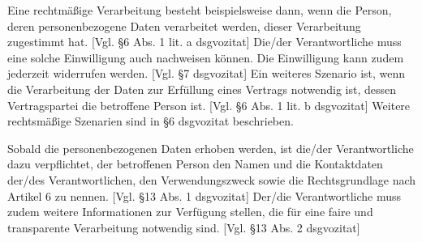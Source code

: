 Eine rechtmäßige Verarbeitung besteht beispielsweise dann, wenn die Person, deren personenbezogene Daten verarbeitet werden, dieser Verarbeitung zugestimmt hat. [Vgl. §6 Abs. 1 lit. a \gls{dsgvozitat}] Die/der Verantwortliche muss eine solche Einwilligung auch nachweisen können. Die Einwilligung kann zudem jederzeit widerrufen werden. [Vgl. §7 \gls{dsgvozitat}] Ein weiteres Szenario ist, wenn die Verarbeitung der Daten zur Erfüllung eines Vertrags notwendig ist, dessen Vertragspartei die betroffene Person ist. [Vgl. §6 Abs. 1 lit. b \gls{dsgvozitat}] Weitere rechtsmäßige Szenarien sind in §6 \gls{dsgvozitat} beschrieben.  

Sobald die personenbezogenen Daten erhoben werden, ist die/der Verantwortliche dazu verpflichtet, der betroffenen Person den Namen und die Kontaktdaten der/des Verantwortlichen, den Verwendungszweck sowie die Rechtsgrundlage nach Artikel 6 zu nennen. [Vgl. §13 Abs. 1 \gls{dsgvozitat}] Der/die Verantwortliche muss zudem weitere Informationen zur Verfügung stellen, die für eine faire und transparente Verarbeitung notwendig sind. [Vgl. §13 Abs. 2 \gls{dsgvozitat}]

